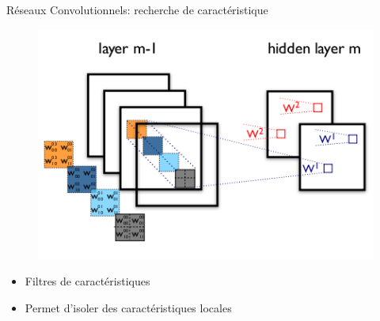 \documentclass{beamer}
\begin{document}
\begin{frame}{Réseaux Convolutionnels: recherche de caractéristique}

    \begin{figure}
      \centering
      \includegraphics[scale=0.5]{../Figures/CNN}
    \end{figure}

    \begin{itemize}
    \item Filtres de caractéristiques\pause
    \item Permet d'isoler des caractéristiques locales\pause
    \end{itemize}
\end{frame}
\end{document}
